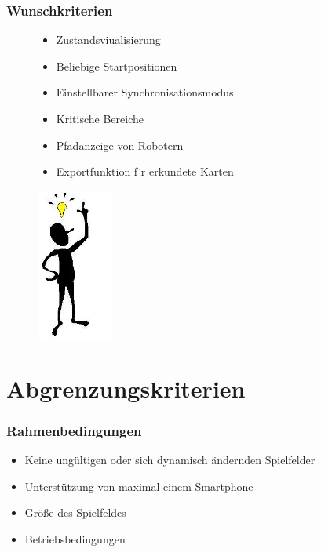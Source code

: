 \documentclass{beamer}
\begin{document}
\begin{frame}
  \frametitle{Wunschkriterien}
  	
  	\begin{figure}[htbp]
	\begin{minipage}[t]{4cm}
		\vspace{30pt}
		\begin{itemize}
			\item Zustandsviualisierung
			\item Beliebige Startpositionen
			\item Einstellbarer Synchronisationsmodus
			\item Kritische Bereiche
			\item Pfadanzeige von Robotern
			\item Exportfunktion f ̈r erkundete Karten

		\end{itemize}
	\end{minipage}
	\hfill
	\begin{minipage}[t]{0.5\textwidth}
		\vspace{0pt}
		\includegraphics[height=5cm]{idee.jpg} 
	\end{minipage}
   \end{figure} 
\end{frame}


\section{Abgrenzungskriterien}

\begin{frame}
  \frametitle{Rahmenbedingungen}
  
  	\begin{itemize}
		\item Keine ungültigen oder sich dynamisch ändernden Spielfelder
		\item Unterstützung von maximal einem Smartphone
		\item Größe des Spielfeldes
		\item Betriebsbedingungen
	\end{itemize}  
\end{frame}
\end{document}
